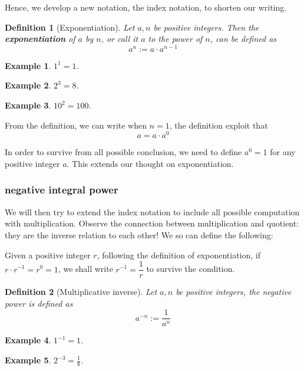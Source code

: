 \documentclass[12pt]{article}
\newtheorem{definition}{Definition}[section]
\newtheorem*{example}{Example}
\begin{document}
    Hence, we develop a new notation, the index notation, to shorten our writing.

    \begin{definition}[Exponentiation]
        Let $a,n$ be positive integers. Then the \textbf{exponentiation} of $a$ by $n$, or call it $a$ to the power of $n$, can be defined as $$a^n:=a\cdot a^{n-1}$$
    \end{definition}

    \begin{example}
        $1^1=1$.
    \end{example}

    \begin{example}
        $2^3=8$.
    \end{example}

    \begin{example}
        $10^2=100$.
    \end{example}

    From the definition, we can write when $n=1$, the definition exploit that $$a=a\cdot a^0$$

    In order to survive from all possible conclusion, we need to define $a^0=1$ for any positive integer $a$. This extends our thought on exponentiation.

    \subsubsection*{negative integral power}

    We will then try to extend the index notation to include all possible computation with multiplication. Observe the connection between multiplication and quotient: they are the inverse relation to each other! We so can define the following:

    Given a positive integer $r$, following the definition of exponentiation, if $r\cdot r^{-1} = r^0 = 1$, we shall write $r^{-1}=\dfrac{1}{r}$ to survive the condition.

    \begin{definition}[Multiplicative inverse]
        Let $a, n$ be positive integers, the negative power is defined as $$a^{-n} := \frac{1}{a^n}$$
    \end{definition}

    \begin{example}
        $1^{-1}=1$.
    \end{example}

    \begin{example}
        $2^{-3}=\frac{1}{8}$.
    \end{example}
\end{document}
